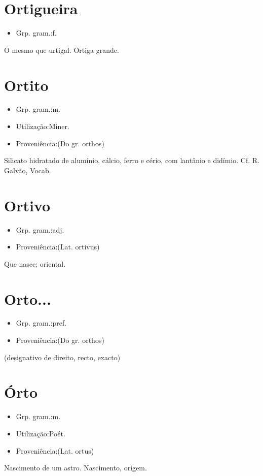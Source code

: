 \section{Ortigueira}
\begin{itemize}
\item {Grp. gram.:f.}
\end{itemize}
O mesmo que \textunderscore urtigal\textunderscore .
Ortiga grande.
\section{Ortito}
\begin{itemize}
\item {Grp. gram.:m.}
\end{itemize}
\begin{itemize}
\item {Utilização:Miner.}
\end{itemize}
\begin{itemize}
\item {Proveniência:(Do gr. \textunderscore orthos\textunderscore )}
\end{itemize}
Silicato hidratado de alumínio, cálcio, ferro e cério, com lantânio e didímio. Cf. R. Galvão, \textunderscore Vocab.\textunderscore 
\section{Ortivo}
\begin{itemize}
\item {Grp. gram.:adj.}
\end{itemize}
\begin{itemize}
\item {Proveniência:(Lat. \textunderscore ortivus\textunderscore )}
\end{itemize}
Que nasce; oriental.
\section{Orto...}
\begin{itemize}
\item {Grp. gram.:pref.}
\end{itemize}
\begin{itemize}
\item {Proveniência:(Do gr. \textunderscore orthos\textunderscore )}
\end{itemize}
(designativo de \textunderscore direito\textunderscore , \textunderscore recto\textunderscore , \textunderscore exacto\textunderscore )
\section{Órto}
\begin{itemize}
\item {Grp. gram.:m.}
\end{itemize}
\begin{itemize}
\item {Utilização:Poét.}
\end{itemize}
\begin{itemize}
\item {Proveniência:(Lat. \textunderscore ortus\textunderscore )}
\end{itemize}
Nascimento de um astro.
Nascimento, origem.
